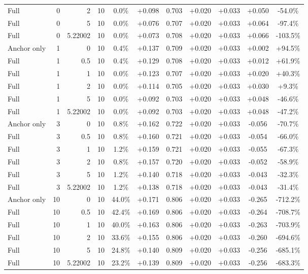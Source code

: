 \begin{table}[htbp]
\begin{tabular}{lrrrccccccc}
Full & 0 & 2 & 10 & 0.0\% & +0.098 & 0.703 & +0.020 & +0.033 & +0.050 & -54.0\% \\
Full & 0 & 5 & 10 & 0.0\% & +0.076 & 0.707 & +0.020 & +0.033 & +0.064 & -97.4\% \\
Full & 0 & 5.22002 & 10 & 0.0\% & +0.073 & 0.708 & +0.020 & +0.033 & +0.066 & -103.5\% \\
Anchor only & 1 & 0 & 10 & 0.4\% & +0.137 & 0.709 & +0.020 & +0.033 & +0.002 & +94.5\% \\
Full & 1 & 0.5 & 10 & 0.4\% & +0.129 & 0.708 & +0.020 & +0.033 & +0.012 & +61.9\% \\
Full & 1 & 1 & 10 & 0.0\% & +0.123 & 0.707 & +0.020 & +0.033 & +0.020 & +40.3\% \\
Full & 1 & 2 & 10 & 0.0\% & +0.114 & 0.705 & +0.020 & +0.033 & +0.030 & +9.3\% \\
Full & 1 & 5 & 10 & 0.0\% & +0.092 & 0.703 & +0.020 & +0.033 & +0.048 & -46.6\% \\
Full & 1 & 5.22002 & 10 & 0.0\% & +0.092 & 0.703 & +0.020 & +0.033 & +0.048 & -47.2\% \\
Anchor only & 3 & 0 & 10 & 0.8\% & +0.162 & 0.722 & +0.020 & +0.033 & -0.056 & -70.7\% \\
Full & 3 & 0.5 & 10 & 0.8\% & +0.160 & 0.721 & +0.020 & +0.033 & -0.054 & -66.0\% \\
Full & 3 & 1 & 10 & 1.2\% & +0.159 & 0.721 & +0.020 & +0.033 & -0.055 & -67.3\% \\
Full & 3 & 2 & 10 & 0.8\% & +0.157 & 0.720 & +0.020 & +0.033 & -0.052 & -58.9\% \\
Full & 3 & 5 & 10 & 1.2\% & +0.140 & 0.718 & +0.020 & +0.033 & -0.043 & -32.3\% \\
Full & 3 & 5.22002 & 10 & 1.2\% & +0.138 & 0.718 & +0.020 & +0.033 & -0.043 & -31.4\% \\
Anchor only & 10 & 0 & 10 & 44.0\% & +0.171 & 0.806 & +0.020 & +0.033 & -0.265 & -712.2\% \\
Full & 10 & 0.5 & 10 & 42.4\% & +0.169 & 0.806 & +0.020 & +0.033 & -0.264 & -708.7\% \\
Full & 10 & 1 & 10 & 40.0\% & +0.163 & 0.806 & +0.020 & +0.033 & -0.263 & -703.9\% \\
Full & 10 & 2 & 10 & 33.6\% & +0.155 & 0.806 & +0.020 & +0.033 & -0.260 & -694.6\% \\
Full & 10 & 5 & 10 & 24.8\% & +0.140 & 0.809 & +0.020 & +0.033 & -0.256 & -685.1\% \\
Full & 10 & 5.22002 & 10 & 23.2\% & +0.139 & 0.809 & +0.020 & +0.033 & -0.256 & -683.3\% \\

\end{tabular}
\end{table}
